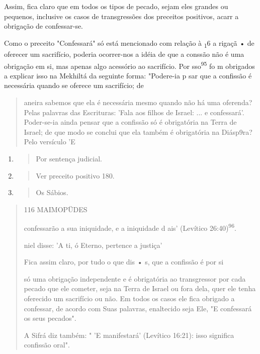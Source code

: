 Assim, fica claro que em todos os tipos de pecado, sejam eles gran­des
ou pequenos, inclusive os casos de transgressões dos preceitos
positivos, acarr a obrigação de confessar-se.

Como o preceito "Confessará" só está mencionado com relação à
\textsubscript{1}6 a rigaçã • de oferecer um sacrifício, poderia
ocorrer-nos a idéia de que a con­ssão não é uma obrigação em si, mas
apenas algo acessório ao sacrifício. Por sso\textsuperscript{95} fo m
obrigados a explicar isso na Mekhiltá da seguinte forma: "Poder­e-ia p
sar que a confissão é necessária quando se oferece um sacrifício; de

\begin{quote}
aneira sabemos que ela é necessária mesmo quando não há uma oferen­da?
Pelas palavras das Escrituras: 'Fala aos filhos de Israel: ... e
confessará'. Poder-se-ia ainda pensar que a confissão só é obrigatória
na Terra de Israel; de que modo se conclui que ela também é obrigatória
na Diásp9ra? Pelo versículo 'E
\end{quote}

\begin{enumerate}
\def\labelenumi{\arabic{enumi}.}
\setcounter{enumi}{92}
\item
  \begin{quote}
  Por sentença judicial.
  \end{quote}
\item
  \begin{quote}
  Ver preceito positivo 180.
  \end{quote}
\item
  \begin{quote}
  Os Sábios.
  \end{quote}
\end{enumerate}

\begin{quote}
116 MAIMOPÜDES

confessarão a sua iniquidade, e a iniquidade d ais' (Levítico
26:40)\textsuperscript{96}.

niel disse: 'A ti, ó Eterno, pertence a justiça'

Fica assim claro, por tudo o que dis • s, que a confissão é por si

só uma obrigação independente e é obrigatória ao transgressor por cada
peca­do que ele cometer, seja na Terra de Israel ou fora dela, quer ele
tenha ofereci­do um sacrifício ou não. Em todos os casos ele fica
obrigado a confessar, de acordo com Suas palavras, enaltecido seja Ele,
"E confessará os seus pecados".

A Sifrá diz também: " 'E manifestará' (Levítico 16:21): isso significa
confissão oral".
\end{quote}

